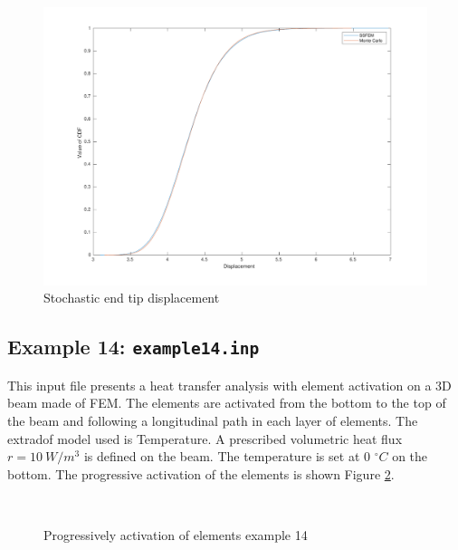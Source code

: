 \documentclass[oneside,11pt,times]{book}
\begin{document}
\begin{figure}[H]
    \centering
    \includegraphics[width=0.6\linewidth]{imgs/Examples/ex13.pdf}
    \caption{Stochastic end tip displacement}
    \label{fig:ex13}
\end{figure}


\newpage
\subsection{Example 14: \texttt{example14.inp}}
This input file presents a heat transfer analysis with element activation on a 3D beam made of FEM. The elements are activated from the bottom to the top of the beam and following a longitudinal path in each layer of elements. The extradof model used is Temperature. A prescribed volumetric heat flux $r=10\ W/m^3$ is defined on the beam. The temperature is set at 0 $^{\circ}C$ on the bottom.
The progressive activation of the elements is shown Figure \ref{ex14}.

\begin{figure}[H]
  \begin{center}
    \mbox{
      \quad
       }
    \caption{Progressively activation of elements example 14}
    \label{ex14}
  \end{center}
\end{figure}
\end{document}
